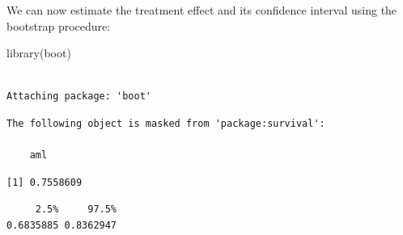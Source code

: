 \documentclass[
  letterpaper,
  DIV=11,
  numbers=noendperiod]{scrreprt}
\newenvironment{Shaded}{\begin{snugshade}}{\end{snugshade}}
\newcommand{\AttributeTok}[1]{\textcolor[rgb]{0.40,0.45,0.13}{#1}}
\newcommand{\CommentTok}[1]{\textcolor[rgb]{0.37,0.37,0.37}{#1}}
\newcommand{\DecValTok}[1]{\textcolor[rgb]{0.68,0.00,0.00}{#1}}
\newcommand{\FloatTok}[1]{\textcolor[rgb]{0.68,0.00,0.00}{#1}}
\newcommand{\FunctionTok}[1]{\textcolor[rgb]{0.28,0.35,0.67}{#1}}
\newcommand{\NormalTok}[1]{\textcolor[rgb]{0.00,0.23,0.31}{#1}}
\newcommand{\OtherTok}[1]{\textcolor[rgb]{0.00,0.23,0.31}{#1}}
\newcommand{\SpecialCharTok}[1]{\textcolor[rgb]{0.37,0.37,0.37}{#1}}
\begin{document}
We can now estimate the treatment effect and its confidence interval
using the bootstrap procedure:

\begin{Shaded}
\begin{Highlighting}[]
\FunctionTok{library}\NormalTok{(boot)}
\end{Highlighting}
\end{Shaded}

\begin{verbatim}

Attaching package: 'boot'
\end{verbatim}

\begin{verbatim}
The following object is masked from 'package:survival':

    aml
\end{verbatim}

\begin{Shaded}
\end{Shaded}

\begin{verbatim}
[1] 0.7558609
\end{verbatim}

\begin{Shaded}
\end{Shaded}

\begin{verbatim}
     2.5%     97.5% 
0.6835885 0.8362947 
\end{verbatim}
\end{document}
